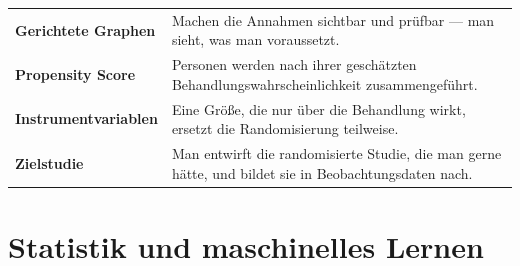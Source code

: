 \begin{merksatz}
\begin{center}
{\small
\renewcommand{\arraystretch}{1.5}
\begin{tabular}{@{}P{3.2cm}P{5.4cm}@{}}
\toprule
\textbf{Gerichtete Graphen} & Machen die Annahmen sichtbar und prüfbar --- man sieht, was man voraussetzt.\\
\textbf{Propensity Score} & Personen werden nach ihrer geschätzten Behandlungswahrscheinlichkeit zusammengeführt.\\
\textbf{Instrument\-variablen} & Eine Größe, die nur über die Behandlung wirkt, ersetzt die Randomisierung teilweise.\\
\textbf{Zielstudie} & Man entwirft die randomisierte Studie, die man gerne hätte, und bildet sie in Beobachtungsdaten nach.\\
\bottomrule
\end{tabular}}
\end{center}

\begin{center}
\begin{minipage}{0.88\textwidth}
\end{minipage}
\end{center}
\end{merksatz}

\section{Statistik und maschinelles Lernen}

